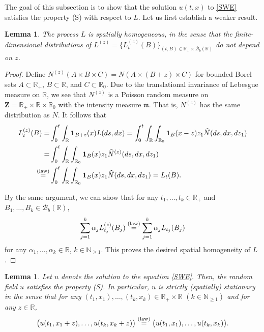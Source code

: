 \documentclass[letterpaper, 11pt,  reqno]{amsart}
\newcommand{\wh}{\widehat}
\newtheorem{lemma}[theorem]{Lemma}
\newcommand{\noi}{\noindent}
\newcommand{\R}{\mathbb{R}}
\newcommand{\bR}{\mathbb{R}}
\newcommand{\cB}{\mathcal{B}}
\newcommand{\al}{\alpha}
\newcommand{\ind}{\mathbf 1}
\newcommand{\N}{\mathbb{N}}
\newcommand{\fm}{\mathfrak{m}}
\numberwithin{equation}{section}
\numberwithin{theorem}{section}
\begin{document}
The goal of this subsection is to show that the solution $u(t,x)$ to \eqref{SWE}
satisfies the property (S) with respect to $L$. 
Let us first establish a weaker result. 


\begin{lemma}
\label{spat-homog}
The process $L$ is spatially homogeneous, 
in the sense that the finite-dimensional distributions 
of $L^{(z)} = \{L_t^{(z)}(B)\}_{(t, B)\in\R_+  \times \cB_b(\bR)}$ do not depend on $z$.
\end{lemma}
 
\begin{proof}
Define $N^{(z)}(A \times B \times C)=N(A \times (B+z) \times C)$
 for bounded Borel sets $A \subset \R_{+}$,  $B \subset \R$, and $C \subset \R_0$. 
 Due to the translational invariance of Lebesgue measure on $\R$,
 we see that   $N^{(z)}$ is a Poisson random measure on $\mathbf{Z} =\R_+\times\R\times\R_0$
 with the intensity measure $\fm$.
 That is, $N^{(z)}$ has  the same distribution as $N$.
 It follows that
\begin{align*}
L_t^{(z)}(B)=&\int_0^t \int_{\bR}\ind_{B+z}(x)L(ds,dx)=\int_0^t \int_{\bR} \int_{\bR_0}\ind_{B}(x-z) z_1 \wh{N}(ds,dx,dz_1)\\
= &\int_0^t \int_{\bR} \int_{\bR_0}\ind_{B}(x) z_1 \wh{N}^{(z)}(ds,dx,dz_1)\\
 \stackrel{{\rm (law)}}{=} & 
\int_0^t \int_{\bR} \int_{\bR_0}\ind_{B}(x) z_1 \wh{N}(ds,dx,dz_1)=L_t(B).
\end{align*}


\noi
By the same argument, we can show that 
  for any $t_1, \ldots,t_k \in \bR_{+}$ and $B_1,\ldots,B_k \in \cB_b(\bR)$,
\[
\sum_{j=1}^k \al_j  L_{t_j}^{(z)}(B_j)  \stackrel{{\rm (law)}}{=}  \sum_{j=1}^k \al_j  L_{t_j}(B_j) 
\]
for any $\al_1, ... , \al_k\in\R$, $k\in\N_{\geq 1}$. This proves
the desired spatial homogeneity of $L$. \qedhere

 



\end{proof}










\begin{lemma}
\label{lem:stat}
Let  $u$ denote the solution to  the  equation \eqref{SWE}.
Then, the random field $u$  satisfies the  property {\rm (S)}.
In particular, $u$ is strictly {\rm(}spatially{\rm)} stationary in the sense that 
 for any $(t_1,x_1),\ldots,(t_k,x_k)\in \bR_{+} \times \bR$ $(k\in\N_{\geq 1})$ and for any $z \in \bR$,
\begin{equation}
\label{station}
\big(u(t_1,x_1+z),\ldots,u(t_k,x_k+z)\big) \stackrel{{\rm (law)}}{=} \big(u(t_1,x_1),\ldots,u(t_k,x_k)\big).
\end{equation}
\end{lemma}
\end{document}
